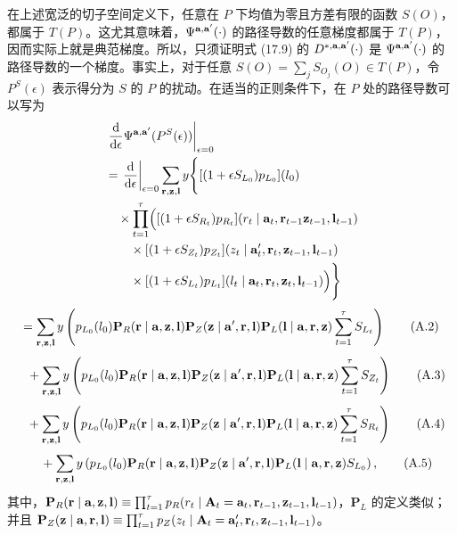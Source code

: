 在上述宽泛的切子空间定义下，任意在 $P$ 下均值为零且方差有限的函数 $S(O)$，都属于 $T(P)$。这尤其意味着，$\Psi^{\mathbf a,\mathbf a'}(\cdot)$ 的路径导数的任意梯度都属于 $T(P)$，因而实际上就是典范梯度。所以，只须证明式 (17.9) 的 $D^{*,\mathbf a,\mathbf a'}(\cdot)$ 是 $\Psi^{\mathbf a,\mathbf a'}(\cdot)$ 的路径导数的一个梯度。事实上，对于任意 $S(O)=\sum_jS_{O_j}(O)\in T(P)$，令 $P^S(\epsilon)$ 表示得分为 $S$ 的 $P$ 的扰动。在适当的正则条件下，在 $P$ 处的路径导数可以写为
\begingroup\small
\[
\begin{aligned}
&\left.\frac{\mathrm d}{\mathrm d\epsilon}\Psi^{\mathbf a,\mathbf a'}(P^S(\epsilon))\right|_{\epsilon=0}\\
&=\left.\frac{\mathrm d}{\mathrm d\epsilon}\right|_{\epsilon=0}
 \sum_{\mathbf r,\mathbf z,\mathbf l}y\Biggl\{
 [(1+\epsilon S_{L_0})p_{L_0}](l_0)\\
&\quad\times\prod_{t=1}^\tau\Bigl(
 [(1+\epsilon S_{R_t})p_{R_t}](r_t\mid\mathbf a_t,\mathbf r_{t-1}\mathbf z_{t-1},\mathbf l_{t-1})\\
&\qquad\times[(1+\epsilon S_{Z_t})p_{Z_t}](z_t\mid\mathbf a_t',\mathbf r_t,\mathbf z_{t-1},\mathbf l_{t-1})\\
&\qquad\times[(1+\epsilon S_{L_t})p_{L_t}](l_t\mid\mathbf a_t,\mathbf r_t,\mathbf z_t,\mathbf l_{t-1})\Bigr)\Biggr\}
\end{aligned}
\]
\begin{equation}
=\sum_{\mathbf r,\mathbf z,\mathbf l}y\left(p_{L_0}(l_0)\mathbf P_R(\mathbf r\mid\mathbf a,\mathbf z,\mathbf l)\mathbf P_Z(\mathbf z\mid\mathbf a',\mathbf r,\mathbf l)\mathbf P_L(\mathbf l\mid\mathbf a,\mathbf r,\mathbf z)\sum_{t=1}^\tau S_{L_t}\right)
\tag{A.2}
\end{equation}
\begin{equation}
\phantom{=}+\sum_{\mathbf r,\mathbf z,\mathbf l}y\left(p_{L_0}(l_0)\mathbf P_R(\mathbf r\mid\mathbf a,\mathbf z,\mathbf l)\mathbf P_Z(\mathbf z\mid\mathbf a',\mathbf r,\mathbf l)\mathbf P_L(\mathbf l\mid\mathbf a,\mathbf r,\mathbf z)\sum_{t=1}^\tau S_{Z_t}\right)
\tag{A.3}
\end{equation}
\begin{equation}
\phantom{=}+\sum_{\mathbf r,\mathbf z,\mathbf l}y\left(p_{L_0}(l_0)\mathbf P_R(\mathbf r\mid\mathbf a,\mathbf z,\mathbf l)\mathbf P_Z(\mathbf z\mid\mathbf a',\mathbf r,\mathbf l)\mathbf P_L(\mathbf l\mid\mathbf a,\mathbf r,\mathbf z)\sum_{t=1}^\tau S_{R_t}\right)
\tag{A.4}
\end{equation}
\begin{equation}
\phantom{=}+\sum_{\mathbf r,\mathbf z,\mathbf l}y\left(p_{L_0}(l_0)\mathbf P_R(\mathbf r\mid\mathbf a,\mathbf z,\mathbf l)\mathbf P_Z(\mathbf z\mid\mathbf a',\mathbf r,\mathbf l)\mathbf P_L(\mathbf l\mid\mathbf a,\mathbf r,\mathbf z) S_{L_0}\right),
\tag{A.5}
\end{equation}
\endgroup
其中，$\mathbf P_R(\mathbf r\mid\mathbf a,\mathbf z,\mathbf l)\equiv\prod_{t=1}^\tau p_R(r_t\mid\mathbf A_t=\mathbf a_t,\mathbf r_{t-1},\mathbf z_{t-1},\mathbf l_{t-1})$，$\mathbf P_L$ 的定义类似；并且
$\mathbf P_Z(\mathbf z\mid\mathbf a,\mathbf r,\mathbf l)\equiv\prod_{t=1}^\tau p_Z(z_t\mid\mathbf A_t=\mathbf a_t',\mathbf r_t,\mathbf z_{t-1},\mathbf l_{t-1})$。

